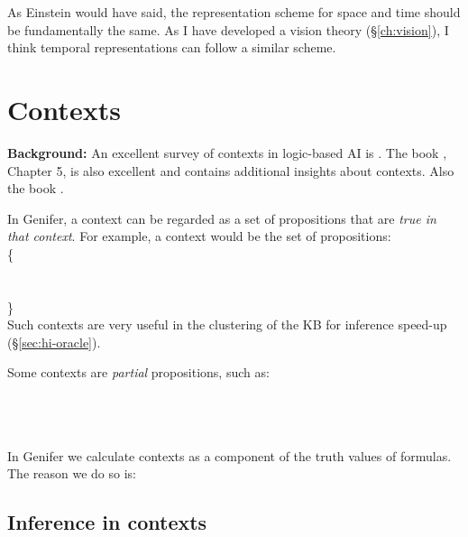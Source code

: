 As Einstein would have said, the representation scheme for space and time should be fundamentally the same.  As I have developed a vision theory (\S\ref{ch:vision}), I think temporal representations can follow a similar scheme.  %

\section{Contexts}
\label{sec:contexts}

\textbf{Background:}  An excellent survey of contexts in logic-based AI is \citep*{Akman1996}.  The book \citep*{Sowa2000}, Chapter 5, is also excellent and contains additional insights about contexts.  Also the book \citep*{Bonzon2000}.

In Genifer, a context can be regarded as a set of propositions that are \textit{true in that context}.  For example, a context would be the set of propositions:\\
\tab \{ \\
\tab {}\\
\tab {}\\
\tab {} \}\\
Such contexts are very useful in the clustering of the KB for inference speed-up (\S\ref{sec:hi-oracle}).

Some contexts are \textit{partial} propositions, such as:\\
\tab {}\\
\tab {}\\
\tab {}\\
\tab {}

In Genifer we calculate contexts as a component of the truth values of formulas.  The reason we do so is:

\subsection{Inference in contexts}

